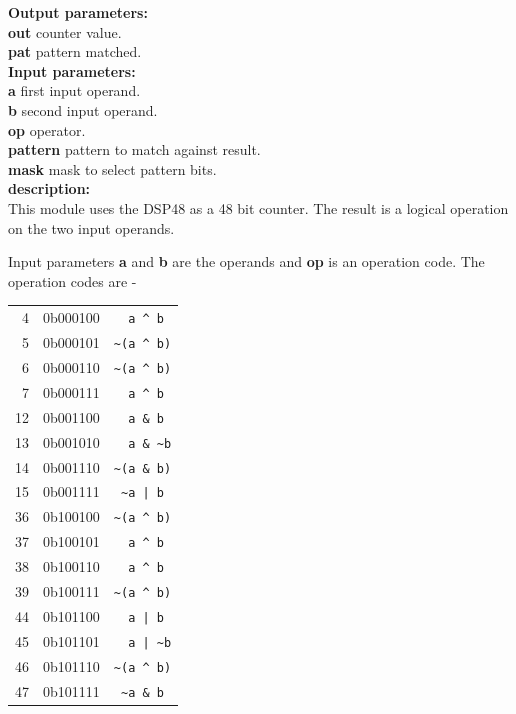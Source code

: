             {\bf Output parameters:} \\
            {\bf out} counter value.\\
            {\bf pat} pattern matched.\\


            {\bf Input parameters:} \\
            {\bf a} first input operand.\\
            {\bf b} second input operand.\\
            {\bf op} operator.\\
            {\bf pattern} pattern to match against result.\\
            {\bf mask} mask to select pattern bits.\\

            {\bf description:} \\
            This module uses the DSP48 as a 48 bit counter. The result
            is a logical operation on the two input operands.

            Input parameters {\bf a} and {\bf b} are the operands and
            {\bf op} is an operation code. The operation codes are -

            \begin{tabular}{| r r r |}
            \hline
            4   & 0b000100    & \verb'  a ^ b ' \\
            5   & 0b000101    & \verb'~(a ^ b)' \\
            6   & 0b000110    & \verb'~(a ^ b)' \\
            7   & 0b000111    & \verb'  a ^ b ' \\
            12  & 0b001100    & \verb'  a & b ' \\
            13  & 0b001010    & \verb'  a & ~b' \\
            14  & 0b001110    & \verb'~(a & b)' \\
            15  & 0b001111    & \verb' ~a | b ' \\
            36  & 0b100100    & \verb'~(a ^ b)' \\
            37  & 0b100101    & \verb'  a ^ b ' \\
            38  & 0b100110    & \verb'  a ^ b ' \\
            39  & 0b100111    & \verb'~(a ^ b)' \\
            44  & 0b101100    & \verb'  a | b ' \\
            45  & 0b101101    & \verb'  a | ~b' \\
            46  & 0b101110    & \verb'~(a ^ b)' \\
            47  & 0b101111    & \verb' ~a & b ' \\
            \hline
            \end{tabular}

